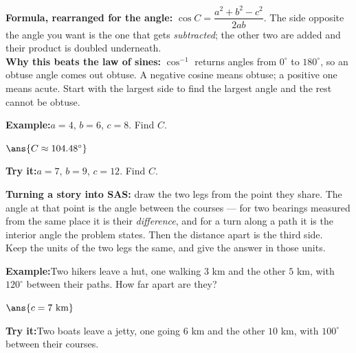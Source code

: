 \documentclass[12pt]{article}
\begin{document}
\begin{formulabox}
\textbf{Formula, rearranged for the angle:}
$\cos C = \dfrac{a^{2} + b^{2} - c^{2}}{2ab}$. The side opposite the angle you
want is the one that gets \emph{subtracted}; the other two are added and their
product is doubled underneath.\\[3pt]
\textbf{Why this beats the law of sines:} $\cos^{-1}$ returns angles from
$0^\circ$ to $180^\circ$, so an obtuse angle comes out obtuse. A negative
cosine means obtuse; a positive one means acute. Start with the largest side to
find the largest angle and the rest cannot be obtuse.
\end{formulabox}
\begin{examplebox}
\textbf{Example:}\quad $a = 4$, $b = 6$, $c = 8$. Find $C$.

$\ans{C \approx 104.48^\circ}$
\end{examplebox}
\begin{tryitbox}
\textbf{Try it:}\quad $a = 7$, $b = 9$, $c = 12$. Find $C$.\\[2pt]
\end{tryitbox}

\begin{formulabox}
\textbf{Turning a story into SAS:} draw the two legs from the point they share.
The angle at that point is the angle between the courses --- for two bearings
measured from the same place it is their \emph{difference}, and for a turn along
a path it is the interior angle the problem states. Then the distance apart is
the third side.\\[3pt]
Keep the units of the two legs the same, and give the answer in those units.
\end{formulabox}
\begin{examplebox}
\textbf{Example:}\quad Two hikers leave a hut, one walking $3$ km and the other
$5$ km, with $120^\circ$ between their paths. How far apart are they?

$\ans{c = 7\ \text{km}}$
\end{examplebox}
\begin{tryitbox}
\textbf{Try it:}\quad Two boats leave a jetty, one going $6$ km and the other
$10$ km, with $100^\circ$ between their courses.\\[2pt]
\end{tryitbox}
\end{document}
